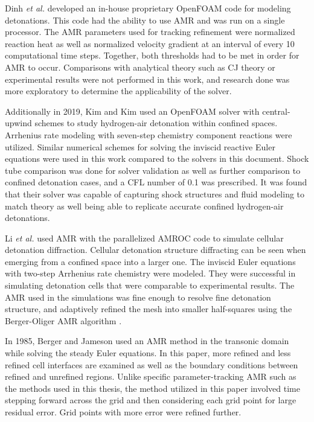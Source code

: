 Dinh \textit{et al.} \cite{dinh} developed an in-house proprietary OpenFOAM code for modeling detonations. This code had the ability to use AMR and was run on a single processor. The AMR parameters used for tracking refinement were normalized reaction heat as well as normalized velocity gradient at an interval of every 10 computational time steps. Together, both thresholds had to be met in order for AMR to occur. Comparisons with analytical theory such as CJ theory or experimental results were not performed in this work, and research done was more exploratory to determine the applicability of the solver. 

Additionally in 2019, Kim and Kim \cite{kim} used an OpenFOAM solver with central-upwind schemes to study hydrogen-air detonation within confined spaces. Arrhenius rate modeling with seven-step chemistry component reactions were utilized. Similar numerical schemes for solving the inviscid reactive Euler equations were used in this work compared to the solvers in this document. Shock tube comparison was done for solver validation as well as further comparison to confined detonation cases, and a CFL number of 0.1 was prescribed. It was found that their solver was capable of capturing shock structures and fluid modeling to match theory as well being able to replicate accurate confined hydrogen-air detonations. 

Li \textit{et al.} \cite{li} used AMR with the parallelized AMROC code to simulate cellular detonation diffraction. Cellular detonation structure diffracting can be seen when emerging from a confined space into a larger one. The inviscid Euler equations with two-step Arrhenius rate chemistry were modeled. They were successful in simulating detonation cells that were comparable to experimental results. The AMR used in the simulations was fine enough to resolve fine detonation structure, and adaptively refined the mesh into smaller half-squares using the Berger-Oliger AMR algorithm \cite{berger1984}. 

In 1985, Berger and Jameson \cite{berger1985} used an AMR method in the transonic domain while solving the steady Euler equations. In this paper, more refined and less refined cell interfaces are examined as well as the boundary conditions between refined and unrefined regions. Unlike specific parameter-tracking AMR such as the methods used in this thesis, the method utilized in this paper involved time stepping forward across the grid and then considering each grid point for large residual error. Grid points with more error were refined further. 

